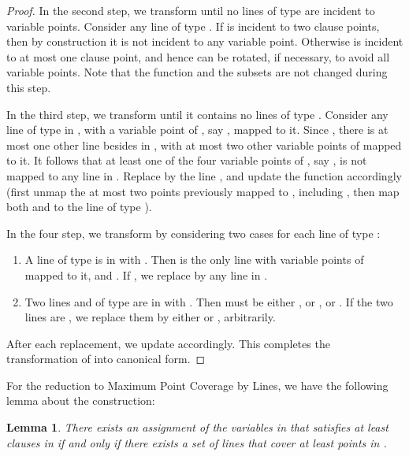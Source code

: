 \documentclass[letterpaper,11pt]{article}
\newtheorem{lemma}{Lemma}
\begin{document}
\begin{proof}
In the second step, 
we transform  until no lines of type  are incident to variable
points. Consider any line  of type .
If  is incident to two clause points,
then by construction it is not incident to any variable point.
Otherwise  is incident to at most one clause point,
and hence can be rotated, if necessary, to avoid all variable points.
Note that the function  and the subsets 
are not changed during this step.

In the third step,
we transform  until it contains no lines of type .
Consider any line  of type  in ,
with a variable point of , say , mapped to it.
Since ,
there is at most one other line besides  in ,
with at most two other variable points of  mapped to it.
It follows that at least one of the four variable points of ,
say , is not mapped to any line in .
Replace  by the line , and update the function  accordingly
(first unmap the at most two points previously mapped to ,
including ,
then map both  and  to the line  of type ).

In the four step,
we transform  by considering two cases for each line of type :
\begin{enumerate} \itemsep -1pt

\item
A line  of type  is in  with .
Then  is the only line with variable points of  mapped to it,
and
.
If ,
we replace  by any line in
.

\item
Two lines  and  of type  are in  with .
Then  must be
either ,
or ,
or .
If the two lines are ,
we replace them by
either 
or , arbitrarily.
\end{enumerate}
After each replacement,
we update  accordingly.
This completes the transformation of  into canonical form.
\end{proof}

For the reduction to {\sc Maximum Point Coverage by Lines},
we have the following lemma about the construction:

\begin{lemma}\label{lem:max-iff}
There exists an assignment of the variables in 
that satisfies at least  clauses in 
if and only if
there exists a set of  lines
that cover at least  points in .
\end{lemma}
\end{document}
